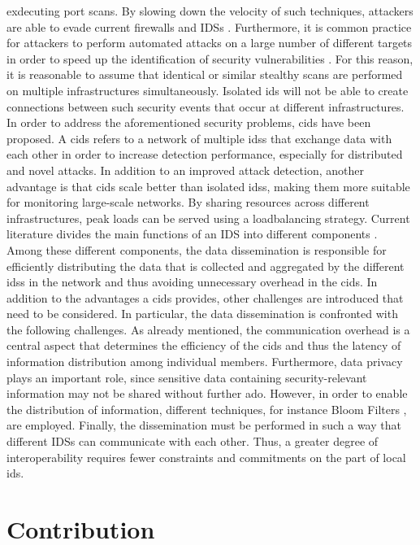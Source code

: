 \documentclass[../../main.tex]{subfiles}
\begin{document}
exdecuting port scans. By slowing down the velocity of such techniques, attackers are able to evade current firewalls and IDSs \cite{riquet2012large}. Furthermore, it is common practice for attackers to perform automated attacks on a large number of different targets in order to speed up the identification of security vulnerabilities \cite{savage2005}. For this reason, it is reasonable to assume that identical or similar stealthy scans are performed on multiple infrastructures simultaneously. Isolated \gls{ids} will not be able to create connections between such security events that occur at different infrastructures. In order to address the aforementioned security problems, \gls{cids} have been proposed. A \gls{cids} refers to a network of multiple \glspl{ids} that exchange data with each other in order to increase detection performance, especially for distributed and novel attacks. In addition to an improved attack detection, another advantage is that \gls{cids} scale better than isolated \glspl{ids}, making them more suitable for monitoring large-scale networks. By sharing resources across different infrastructures, peak loads can be served using a loadbalancing strategy. Current literature divides the main functions of an IDS into different components \cite{vasilomanolakis_collaborative_2016}. Among these different components, the data dissemination is responsible for efficiently distributing the data that is collected and aggregated by the different \glspl{ids} in the network and thus avoiding unnecessary overhead in the \gls{cids}. In addition to the advantages a \gls{cids} provides, other challenges are introduced that need to be considered. In particular, the data dissemination is confronted with the following challenges. As already mentioned, the communication overhead is a central aspect that determines the efficiency of the \gls{cids} and thus the latency of information distribution among individual members. Furthermore, data privacy plays an important role, since sensitive data containing security-relevant information may not be shared without further ado. However, in order to enable the distribution of information, different techniques, for instance Bloom Filters \cite{Vasilomanolakis2015SkipMon} \cite{Locasto2005}, are employed. Finally, the dissemination must be performed in such a way that different IDSs can communicate with each other. Thus, a greater degree of interoperability requires fewer constraints and commitments on the part of local \gls{ids}.

\section{Contribution}
\end{document}
